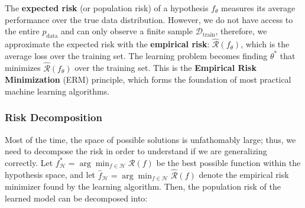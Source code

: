 The \textbf{expected risk} (or population risk) of a hypothesis $f_\theta$ measures its 
average performance over the true data distribution.
%
However, we do not have access to the entire $p_{\text{data}}$ and can only observe a finite sample 
$\mathcal{D}_{\text{train}}$, therefore, we approximate 
the expected risk with the \textbf{empirical risk}: $\hat{\mathcal{R}}(f_\theta)$, which
is the average loss over the training set.\newline
The learning problem becomes finding $\theta^*$ that minimizes $\hat{\mathcal{R}}(f_\theta)$ 
over the training set. This is the \textbf{Empirical Risk Minimization} (ERM) principle, 
which forms the foundation of most practical machine learning algorithms.


\subsubsection{Risk Decomposition}

Most of the time, the space of possible solutions is unfathomably large; thus, we need to decompose the risk in order to understand if 
we are generalizing correctly.\newline
Let $f_{\mathcal{H}}^* = \arg\min_{f \in \mathcal{H}} \mathcal{R}(f)$ be the best possible function within the hypothesis space, 
and let $\hat f_{\mathcal{H}} = \arg\min_{f \in \mathcal{H}} \hat{\mathcal{R}}(f)$ denote the empirical risk minimizer found by the learning algorithm.
Then, the population risk of the learned model can be decomposed into: \cite{10.5555/3360093}\cite{Vapnik1998}\cite{mjt_dlt}\cite[pag. 33, Ch 2]{bach2024learning}


